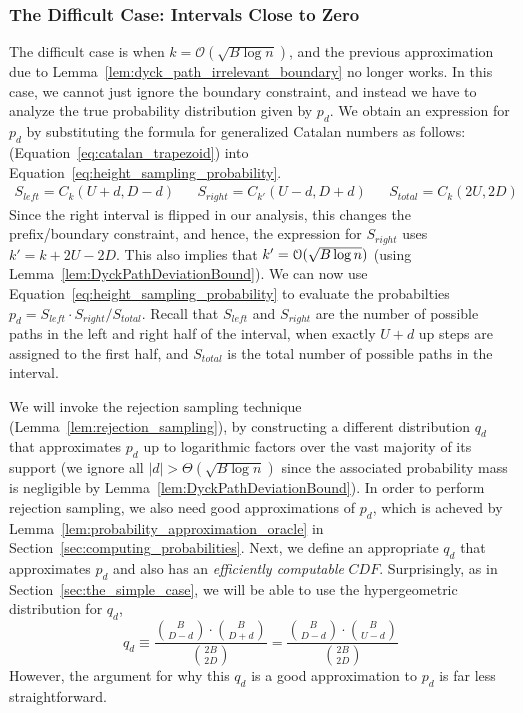 \subsubsection{The Difficult Case: Intervals Close to Zero}
\label{sec:the_difficult_case}
The difficult case is when $k = \mathcal{O}(\sqrt{B\log n})$,
and the previous approximation due to Lemma~\ref{lem:dyck_path_irrelevant_boundary} no longer works.
In this case, we cannot just ignore the boundary constraint, and instead we have to analyze the true probability distribution given by $p_d$.
We obtain an expression for $p_d$ by substituting the formula for generalized Catalan numbers as follows:
(Equation~\ref{eq:catalan_trapezoid}) into Equation~\ref{eq:height_sampling_probability}.
\begin{align}
    S_{left} = C_k(U+d,D-d)
    &&S_{right} = C_{k'}(U-d,D+d)
    &&S_{total} = C_k(2U,2D)
\end{align}
Since the right interval is flipped in our analysis, this changes the prefix/boundary constraint,
and hence, the expression for $S_{right}$ uses $k' = k+2U-2D$.
This also implies that $k' = \Bo(\sqrt{B\log n})$ (using Lemma~\ref{lem:DyckPathDeviationBound}).
We can now use Equation~\ref{eq:height_sampling_probability} to evaluate the probabilties $p_d = S_{left}\cdot S_{right}/S_{total}$.
Recall that $S_{left}$ and $S_{right}$ are the number of possible paths in the left and right half of the interval,
when exactly $U+d$ up steps are assigned to the first half, and $S_{total}$ is the total number of possible paths in the interval.

We will invoke the rejection sampling technique (Lemma~\ref{lem:rejection_sampling}), by constructing a different distribution $q_d$
that approximates $p_d$ up to logarithmic factors over the vast majority of its support
(we ignore all $|d|>\Theta(\sqrt{B\log n})$ since the associated probability mass is negligible by Lemma~\ref{lem:DyckPathDeviationBound}).
In order to perform rejection sampling, we also need good approximations of $p_d$,
which is acheved by Lemma~\ref{lem:probability_approximation_oracle} in Section~\ref{sec:computing_probabilities}.
Next, we define an appropriate $q_d$ that approximates $p_d$ and also has an \emph{efficiently computable} $CDF$.
Surprisingly, as in Section~\ref{sec:the_simple_case}, we will be able to use the hypergeometric distribution for $q_d$,
\[
q_d \equiv \frac{{B\choose D-d}\cdot{B\choose D+d}}{{2B\choose 2D}} = \frac{{B\choose D-d}\cdot{B\choose U-d}}{{2B\choose 2D}}
\]
However, the argument for why this $q_d$ is a good approximation to $p_d$ is far less straightforward.

